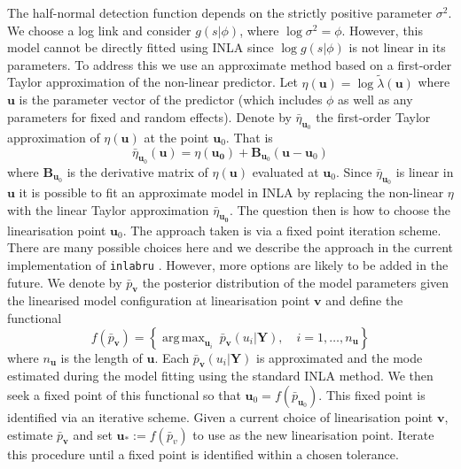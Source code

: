 \documentclass{stylefile16/statsoc}
\newcommand{\bm}{\boldsymbol}  %
\DeclareMathOperator*{\argmax}{arg\,max}  %
\begin{document}
The half-normal detection function depends on the strictly positive parameter $\sigma^2$.  We choose a log link and consider $g(s | \phi)$, where $\log\sigma^2 = \phi$.  However, this model cannot be directly fitted using INLA since $\log g(s | \phi)$ is not linear in its parameters.  To address this we use an approximate method based on a first-order Taylor approximation of the non-linear predictor.  Let $\eta(\bm{u}) = \log \tilde{\lambda}(\bm{u})$ where $\bm{u}$ is the parameter vector of the predictor (which includes $\phi$ as well as any parameters for fixed and random effects).  Denote by $\bar{\eta}_{\bm{u}_0}$ the first-order Taylor approximation of $\eta(\bm{u})$ at the point $\bm{u}_0$.  That is
\begin{equation*}
\bar{\eta}_{\bm{u}_0} (\bm{u}) = \eta(\bm{u_0}) + \bm{B}_{\bm{u}_0}(\bm{u} - \bm{u}_0)
\end{equation*}
where $\bm{B}_{\bm{u}_0}$ is the derivative matrix of $\eta(\bm{u})$ evaluated at $\bm{u}_0$.  Since $\bar{\eta}_{\bm{u}_0}$ is linear in $\bm{u}$ it is possible to fit an approximate model in INLA by replacing the non-linear $\eta$ with the linear Taylor approximation $\bar{\eta}_{\bm{u_0}}$.   The question then is how to choose the linearisation point $\bm{u}_0$.  The approach taken is via a fixed point iteration scheme.  There are many possible choices here and we describe the approach in the current implementation of \texttt{inlabru} \citep{bachl_inlabru_2019}.  However, more options are likely to be added in the future.  We denote by $\bar{p}_{\bm{v}}$ the posterior distribution of the model parameters given the linearised model configuration at linearisation point $\bm{v}$ and define the functional
\begin{equation}
	f(\bar{p}_{\bm{v}}) = \left\{ \argmax_{\bm{u}_i} \: \bar{p}_{\bm{v}}(u_i | \bm{Y}), \quad i = 1, \ldots, n_{\bm{u}} \right\}
\end{equation}
where $n_{\bm{u}}$ is the length of $\bm{u}$.  Each $\bar{p}_{\bm{v}} (u_i | \bm{Y})$ is approximated and the mode estimated during the model fitting using the standard INLA method.
We then seek a fixed point of this functional so that $\bm{u}_0 = f(\bar{p}_{\bm{u}_0})$.  This fixed point is identified via an iterative scheme.  Given a current choice of linearisation point $\bm{v}$, estimate $\bar{p}_{\bm{v}}$ and set $\bm{u}_* :=f(\bar{p}_v)$ to use as the new linearisation point.  Iterate this procedure until a fixed point is identified within a chosen tolerance.
\end{document}
